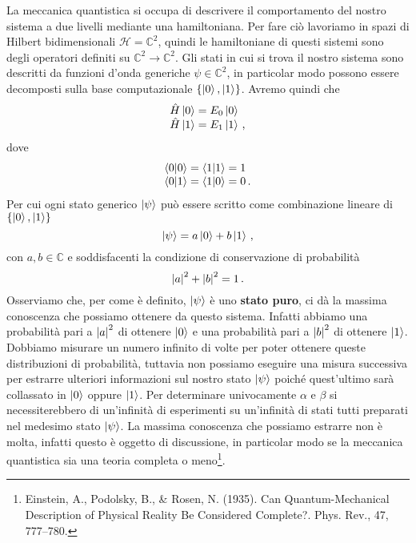 La meccanica quantistica si occupa di descrivere il comportamento del nostro sistema a due livelli mediante una hamiltoniana. Per fare ciò lavoriamo in spazi di Hilbert bidimensionali $\mathcal{H}=\mathbb{C}^2$, quindi le hamiltoniane di questi sistemi sono degli operatori definiti su $\mathbb{C}^2 \rightarrow \mathbb{C}^2$. Gli stati in cui si trova il nostro sistema sono descritti da funzioni d'onda generiche $\psi \in \mathbb{C}^2$, in particolar modo possono essere decomposti sulla base computazionale $\{\ket 0, \ket 1\}$. Avremo quindi che 
\begin{equation*}
    \begin{array}{l}
        \hat H \ket 0 = E_0 \ket 0 \\
        \hat H \ket 1 = E_1 \ket 1 \, ,
    \end{array}
\end{equation*}
dove
\begin{equation*}
    \begin{array}{l}
        \ip{0}{0}=\ip{1}{1}=1 \\
        \ip{0}{1}=\ip{1}{0}=0 \, .
    \end{array}
\end{equation*}
Per cui ogni stato generico $\ket \psi$ può essere scritto come combinazione lineare di $\{\ket 0, \ket 1\}$
\begin{equation*}
    \ket \psi = a \ket 0 + b \ket 1 \, ,
\end{equation*}
con $a,b \in \mathbb{C}$ e soddisfacenti la condizione di conservazione di probabilità
\begin{equation*}
    \abs{a}^2+\abs{b}^2=1 \, .
\end{equation*}
Osserviamo che, per come è definito, $\ket \psi$ è uno \textbf{stato puro}, ci dà la massima conoscenza che possiamo ottenere da questo sistema. Infatti abbiamo una probabilità pari a $\abs{a}^2$ di ottenere $\ket 0$ e una probabilità pari a $\abs{b}^2$ di ottenere $\ket 1$. Dobbiamo misurare un numero infinito di volte per poter ottenere queste distribuzioni di probabilità, tuttavia non possiamo eseguire una misura successiva per estrarre ulteriori informazioni sul nostro stato $\ket \psi$ poiché quest'ultimo sarà collassato in $\ket 0$ oppure $\ket 1$. Per determinare univocamente $\alpha$ e $\beta$ si necessiterebbero di un'infinità di esperimenti su un'infinità di stati tutti preparati nel medesimo stato $\ket \psi$. La massima conoscenza che possiamo estrarre non è molta, infatti questo è oggetto di discussione, in particolar modo se la meccanica quantistica sia una teoria completa o meno\footnote{Einstein, A., Podolsky, B., \& Rosen, N. (1935). Can Quantum-Mechanical Description of Physical Reality Be Considered Complete?. Phys. Rev., 47, 777–780.}.\\
